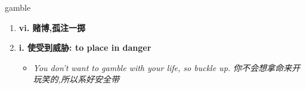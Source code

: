 
\begin{frame}
{\huge gamble}
\begin{center}
\begin{enumerate}\Large
  \item \textbf{vi. 赌博,孤注一掷}
  \item \textbf{i. 使受到威胁: to place in danger}
  \begin{itemize}
    \item \em{\Large{You don't want to gamble with your life, so buckle up. 你不会想拿命来开玩笑的,所以系好安全带}}
  \end{itemize}
\end{enumerate}
\end{center}
\end{frame}
